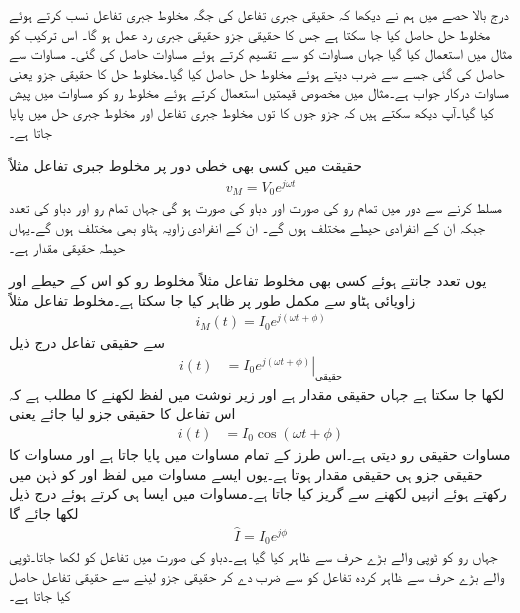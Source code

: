 درج بالا حصے میں ہم نے دیکھا کہ حقیقی جبری تفاعل کی جگہ مخلوط جبری تفاعل نسب کرتے ہوئے مخلوط حل حاصل کیا جا سکتا ہے جس کا حقیقی جزو حقیقی جبری رد عمل ہو گا۔ اس ترکیب کو مثال  میں استعمال کیا گیا جہاں مساوات  کو  سے تقسیم کرتے ہوئے مساوات  حاصل کی گئی۔ مساوات  سے  حاصل کی گئی جسے   سے ضرب دیتے ہوئے مخلوط حل حاصل کیا گیا۔مخلوط حل کا حقیقی جزو یعنی مساوات  درکار جواب ہے۔مثال  میں  مخصوص قیمتیں استعمال کرتے  ہوئے مخلوط رو کو مساوات   میں پیش کیا گیا۔آپ دیکھ سکتے ہیں کہ جزو   جوں کا توں مخلوط جبری تفاعل اور مخلوط جبری حل میں پایا جاتا ہے۔

حقیقت میں کسی بھی خطی دور پر مخلوط جبری تفاعل مثلاً
\begin{align}
v_M=V_0 e^{j \omega t}
\end{align}
مسلط کرنے سے دور میں تمام رو کی صورت  اور دباو کی صورت  ہو گی جہاں تمام رو اور دباو  کی تعدد  جبکہ ان کے انفرادی  حیطے مختلف ہوں گے۔ ان کے انفرادی زاویہ ہٹاو بھی مختلف ہوں گے۔یہاں حیطہ حقیقی مقدار ہے۔

یوں تعدد جانتے ہوئے کسی بھی مخلوط تفاعل مثلاً مخلوط رو کو اس کے حیطے  اور زاویائی ہٹاو  سے مکمل طور پر ظاہر کیا جا سکتا ہے۔مخلوط تفاعل مثلاً 
\begin{align}
i_M(t)=I_0 e^{j(\omega t+\phi)}
\end{align}
سے حقیقی تفاعل درج ذیل
\begin{align}\label{مساوات_بدلتا_حقیقی_رو_الف}
i(t)&=\left. I_0 e^{j(\omega t+\phi)} \right|_{\text{حقیقی}}
\end{align}
لکھا جا سکتا ہے جہاں  حقیقی مقدار ہے اور زیر نوشت میں لفظ  لکھنے کا مطلب ہے کہ اس تفاعل کا حقیقی جزو لیا جائے یعنی
\begin{align}\label{مساوات_بدلتا_حقیقی_رو_ب}
i(t)&=I_0 \cos (\omega t+\phi)
\end{align}
مساوات  حقیقی رو دیتی ہے۔اس طرز کے تمام مساوات میں  پایا جاتا ہے اور مساوات کا حقیقی جزو ہی حقیقی مقدار ہوتا ہے۔یوں ایسے مساوات میں لفظ  اور  کو ذہن میں رکھتے ہوئے انہیں لکھنے سے گریز کیا جاتا ہے۔مساوات  میں ایسا ہی کرتے ہوئے درج ذیل لکھا جائے گا
\begin{align}\label{مساوات_بدلتا_دوری_سمتیہ_الف}
\hat{I}=I_0e^{j\phi}
\end{align}
جہاں رو کو ٹوپی والے بڑے حرف سے ظاہر کیا گیا ہے۔دباو کی صورت میں تفاعل کو  لکھا جاتا۔ٹوپی والے بڑے حرف سے ظاہر کردہ تفاعل کو  سے ضرب دے کر حقیقی جزو لینے سے حقیقی تفاعل حاصل کیا جاتا ہے۔

